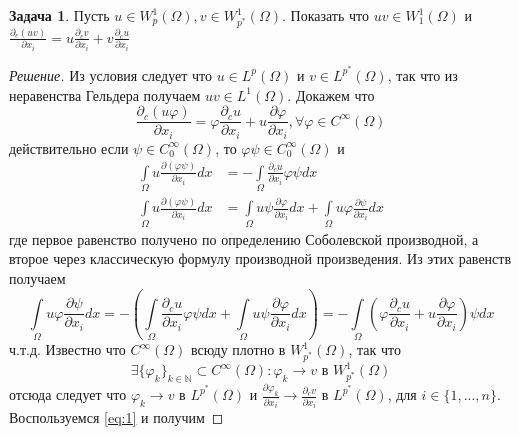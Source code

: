 \documentclass[12pt,a4paper]{article}
\theoremstyle{definition}
\newtheorem{exercise}{Задача}
\newenvironment{solution}
{\renewcommand\qedsymbol{$\blacksquare$}\begin{proof}[Решение]}
{\end{proof}}
\newcommand{\Natural}{\mathbb{N}}
\begin{document}
\addtocounter{exercise}{4}

\begin{exercise}
	Пусть $u \in W_p^1 (\Omega), v \in W_{p^*}^1 (\Omega)$. Показать что $uv \in W_1^1 (\Omega)$ и \\ $\frac{\partial_c (uv)}{\partial x_i} = u\frac{\partial_c v}{\partial x_i} + v\frac{\partial_c u}{\partial x_i}$
\end{exercise}
\begin{solution}
	Из условия следует что $u \in L^p (\Omega)$ и $v \in L^{p^*} (\Omega)$, так что из неравенства Гельдера получаем $uv \in L^1 (\Omega)$. Докажем что 
	\begin{equation}\label{eq:1}
		\frac{\partial_c (u\varphi)}{\partial x_i} = \varphi \frac{\partial_c u}{\partial x_i} + u \frac{\partial \varphi}{\partial x_i}, \forall \varphi \in C^\infty (\Omega)
	\end{equation}
	действительно если $\psi \in C_0^\infty (\Omega)$, то $\varphi \psi \in C_0^\infty (\Omega)$ и 
	\begin{align*}
		\int\limits_{\Omega}{u \frac{\partial (\varphi \psi)}{\partial x_i} dx} &= -\int\limits_{\Omega}{\frac{\partial_c u}{\partial x_i} \varphi \psi dx} \\
		\int\limits_{\Omega}{u \frac{\partial (\varphi \psi)}{\partial x_i} dx} &= \int\limits_{\Omega}{u \psi \frac{\partial \varphi }{\partial x_i} dx} + \int\limits_{\Omega}{u \varphi \frac{\partial \psi}{\partial x_i} dx}
	\end{align*}
	где первое равенство получено по определению Соболевской производной, а второе через классическую формулу производной произведения. Из этих равенств получаем
	\begin{equation*}
		\int\limits_{\Omega}{u \varphi \frac{\partial \psi}{\partial x_i} dx} = - \left( \int\limits_{\Omega}{\frac{\partial_c u}{\partial x_i} \varphi \psi dx} + \int\limits_{\Omega}{u \psi \frac{\partial \varphi }{\partial x_i} dx} \right) = -\int\limits_{\Omega}{\left( \varphi \frac{\partial_c u}{\partial x_i} + u \frac{\partial \varphi}{\partial x_i} \right) \psi dx}
	\end{equation*} 
	ч.т.д.
	Известно что $C^\infty (\Omega)$ всюду плотно в $W_{p^*}^1 (\Omega)$, так что 
	\begin{equation*}
		\exists \{\varphi_k\}_{k\in\Natural} \subset C^\infty (\Omega): \varphi_k \to v \text{ в } W_{p^*}^1 (\Omega)
	\end{equation*}
	отсюда следует что $\varphi_k \to v$ в $L^{p^*} (\Omega)$ и $\frac{\partial \varphi_k}{\partial x_i} \to \frac{\partial_c v}{\partial x_i}$ в $L^{p^*} (\Omega)$, для $i \in \{1, ..., n\}$. Воспользуемся \eqref{eq:1} и получим

\end{solution}
\end{document}
